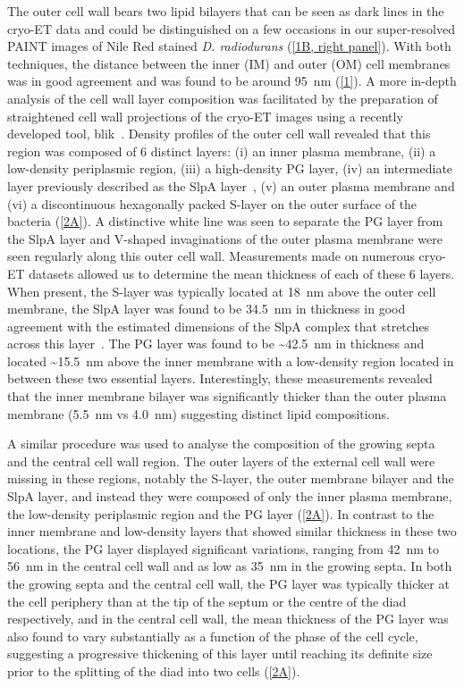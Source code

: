 The outer cell wall bears two lipid bilayers that can be seen as dark lines in the cryo-ET data and could be distinguished on a few occasions in our super-resolved PAINT images of Nile Red stained \textit{D. radiodurans} (\autoref{1B, right panel}).
With both techniques, the distance between the inner (IM) and outer (OM) cell membranes was in good agreement and was found to be around \qty{95}{nm} (\autoref{1}).
A more in-depth analysis of the cell wall layer composition was facilitated by the preparation of straightened cell wall projections of the cryo-ET images using a recently developed tool, blik~\cite{gaifasBlikExtensible3D2024}.
Density profiles of the outer cell wall revealed that this region was composed of 6 distinct layers: (i) an inner plasma membrane, (ii) a low-density periplasmic region, (iii) a high-density PG layer, (iv) an intermediate layer previously described as the SlpA layer~\cite{vonkugelgenMultidomainConnectorLinks2022}, (v) an outer plasma membrane and (vi) a discontinuous hexagonally packed S-layer on the outer surface of the bacteria (\autoref{2A}).
A distinctive white line was seen to separate the PG layer from the SlpA layer and V-shaped invaginations of the outer plasma membrane were seen regularly along this outer cell wall.
Measurements made on numerous cryo-ET datasets allowed us to determine the mean thickness of each of these 6 layers.
When present, the S-layer was typically located at \qty{18}{nm} above the outer cell membrane, the SlpA layer was found to be \qty{34.5}{nm} in thickness in good agreement with the estimated dimensions of the SlpA complex that stretches across this layer~\cite{vonkugelgenMultidomainConnectorLinks2022}.
The PG layer was found to be \sim\qty{42.5}{nm} in thickness and located \sim\qty{15.5}{nm} above the inner membrane with a low-density region located in between these two essential layers.
Interestingly, these measurements revealed that the inner membrane bilayer was significantly thicker than the outer plasma membrane (\qty{5.5}{nm} vs \qty{4.0}{nm}) suggesting distinct lipid compositions.

A similar procedure was used to analyse the composition of the growing septa and the central cell wall region.
The outer layers of the external cell wall were missing in these regions, notably the S-layer, the outer membrane bilayer and the SlpA layer, and instead they were composed of only the inner plasma membrane, the low-density periplasmic region and the PG layer (\autoref{2A}).
In contrast to the inner membrane and low-density layers that showed similar thickness in these two locations, the PG layer displayed significant variations, ranging from \qty{42}{nm} to \qty{56}{nm} in the central cell wall and as low as \qty{35}{nm} in the growing septa.
In both the growing septa and the central cell wall, the PG layer was typically thicker at the cell periphery than at the tip of the septum or the centre of the diad respectively, and in the central cell wall, the mean thickness of the PG layer was also found to vary substantially as a function of the phase of the cell cycle, suggesting a progressive thickening of this layer until reaching its definite size prior to the splitting of the diad into two cells (\autoref{2A}).

